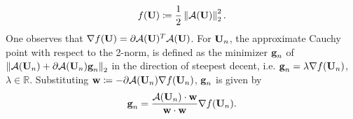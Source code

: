 \begin{equation}
f(\textbf{U}) \coloneqq \frac{1}{2}  \left\| \mathcal{A}(\textbf{U})  \right\|^2_2 .
\end{equation}
One observes that $\nabla f(\textbf{U}) = \partial \mathcal{A}(\textbf{U})^T \mathcal{A}(\textbf{U})$.
For $\textbf{U}_n$, the approximate Cauchy point with respect to the 2-norm, 
is defined as the minimizer $\textbf{g}_n$ of 
$ \left\|  \mathcal{A}(\textbf{U}_{n}) + \partial \mathcal{A} (\textbf{U}_n) \textbf{g}_n \right\|_2  $
in the direction of steepest decent, i.e. $\textbf{g}_n = \lambda \nabla f(\textbf{U}_n)$, $\lambda \in \mathbb{R}$.
Substituting $\textbf{w} \coloneqq - \partial \mathcal{A}(\textbf{U}_n) \nabla f(\textbf{U}_n)$, $\textbf{g}_n$ is given by
\begin{equation}
\textbf{g}_n = \frac{\mathcal{A}(\textbf{U}_n) \cdot \textbf{w}}{\textbf{w} \cdot \textbf{w}} \nabla f(\textbf{U}_n) .
\label{eq:CauchyPoint}
\end{equation}

